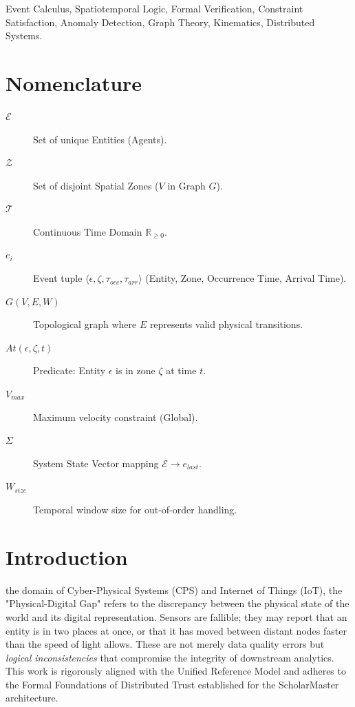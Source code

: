 \documentclass[conference]{IEEEtran}
\begin{document}
\begin{IEEEkeywords}
Event Calculus, Spatiotemporal Logic, Formal Verification, Constraint Satisfaction, Anomaly Detection, Graph Theory, Kinematics, Distributed Systems.
\end{IEEEkeywords}

\section*{Nomenclature}
\begin{description}
    \item[$\mathcal{E}$] Set of unique Entities (Agents).
    \item[$\mathcal{Z}$] Set of disjoint Spatial Zones ($V$ in Graph $G$).
    \item[$\mathcal{T}$] Continuous Time Domain $\mathbb{R}_{\ge 0}$.
    \item[$e_i$] Event tuple $\langle \epsilon, \zeta, \tau_{occ}, \tau_{arr} \rangle$ (Entity, Zone, Occurrence Time, Arrival Time).
    \item[$G(V, E, W)$] Topological graph where $E$ represents valid physical transitions.
    \item[$At(\epsilon, \zeta, t)$] Predicate: Entity $\epsilon$ is in zone $\zeta$ at time $t$.
    \item[$V_{max}$] Maximum velocity constraint (Global).
    \item[$\Sigma$] System State Vector mapping $\mathcal{E} \to e_{last}$.
    \item[$W_{size}$] Temporal window size for out-of-order handling.
\end{description}

\section{Introduction}
 the domain of Cyber-Physical Systems (CPS) and Internet of Things (IoT), the "Physical-Digital Gap" refers to the discrepancy between the physical state of the world and its digital representation. Sensors are fallible; they may report that an entity is in two places at once, or that it has moved between distant nodes faster than the speed of light allows. These are not merely data quality errors but \textit{logical inconsistencies} that compromise the integrity of downstream analytics. This work is rigorously aligned with the Unified Reference Model \cite{P20} and adheres to the Formal Foundations of Distributed Trust \cite{P21} established for the ScholarMaster architecture.
\end{document}

